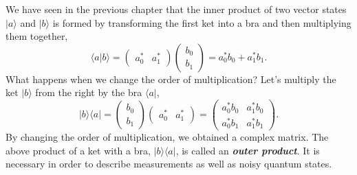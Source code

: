 We have seen in the previous chapter that the inner product of two vector states $|a\rangle$ and $|b\rangle$ is formed by transforming the first ket into a bra and then multiplying them together,
\begin{equation}
    \langle a | b\rangle = \begin{pmatrix} a_0^* & a_1^* \end{pmatrix} \begin{pmatrix} b_0 \\ b_1 \end{pmatrix} = a_0^* b_0 + a_1^* b_1.
\end{equation}
What happens when we change the order of multiplication?
Let's multiply the ket $|b\rangle$ from the right by the bra $\langle a|$,
\begin{equation}
    | b\rangle \langle a | = \begin{pmatrix} b_0 \\ b_1 \end{pmatrix} \begin{pmatrix} a_0^* & a_1^* \end{pmatrix} = \begin{pmatrix} a_0^*b_0 & a_1^*b_0 \\ a_0^*b_1 & a_1^*b_1 \end{pmatrix}.
\end{equation}
By changing the order of multiplication, we obtained a complex matrix.
The above product of a ket with a bra, $|b\rangle\langle a|$, is called an \textbf{\emph{outer product}}. It is necessary in order to describe measurements as well as noisy quantum states.

